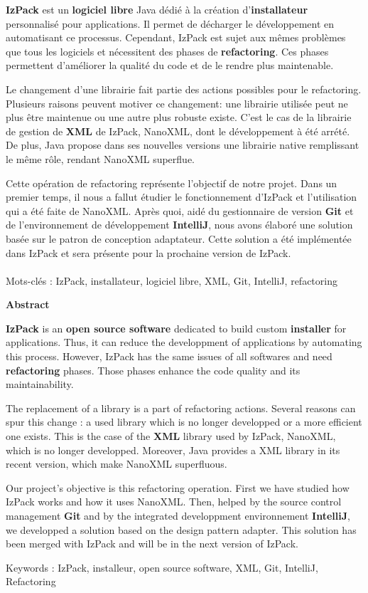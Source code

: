 \textbf{IzPack} est un \textbf{logiciel libre} Java dédié à la création d'\textbf{installateur} personnalisé pour applications.
Il permet de décharger le développement en automatisant ce processus.
Cependant, IzPack est sujet aux mêmes problèmes que tous les logiciels et nécessitent des phases de \textbf{refactoring}.
Ces phases permettent d'améliorer la qualité du code et de le rendre plus maintenable.

Le changement d'une librairie fait partie des actions possibles pour le refactoring.
Plusieurs raisons peuvent motiver ce changement: une librairie utilisée peut ne plus être maintenue ou une autre plus robuste existe.
C'est le cas de la librairie de gestion de \textbf{XML} de IzPack, NanoXML, dont le développement à été arrété.
De plus, Java propose dans ses nouvelles versions une librairie native remplissant le même rôle, rendant NanoXML superflue.

Cette opération de refactoring représente l'objectif de notre projet.
Dans un premier temps, il nous a fallut étudier le fonctionnement d'IzPack et l'utilisation qui a été faite de NanoXML.
Après quoi, aidé du gestionnaire de version \textbf{Git} et de l'environnement de développement \textbf{IntelliJ}, nous avons élaboré une solution basée sur le patron de conception adaptateur.
Cette solution a été implémentée dans IzPack et sera présente pour la prochaine version de IzPack.
~\\
~\\
Mots-clés : IzPack, installateur, logiciel libre, XML, Git, IntelliJ, refactoring
\vfill
\begin{center}\large{\textbf{Abstract}}\end{center}

\textbf{IzPack} is an \textbf{open source software} dedicated to build custom \textbf{installer} for applications.
Thus, it can reduce the developpment of applications by automating this process.
However, IzPack has the same issues of all softwares and need \textbf{refactoring} phases.
Those phases enhance the code quality and its maintainability.

The replacement of a library is a part of refactoring actions.
Several reasons can spur this change : a used library which is no longer developped or a more efficient one exists.
This is the case of the \textbf{XML} library used by IzPack, NanoXML, which is no longer developped.
Moreover, Java provides a XML library in its recent version, which make NanoXML superfluous.

Our project's objective is this refactoring operation.
First we have studied how IzPack works and how it uses NanoXML.
Then, helped by the source control management \textbf{Git} and by the integrated developpment environnement \textbf{IntelliJ}, we developped a solution based on the design pattern adapter.
This solution has been merged with IzPack and will be in the next version of IzPack.

Keywords : IzPack, installeur, open source software, XML, Git, IntelliJ, Refactoring